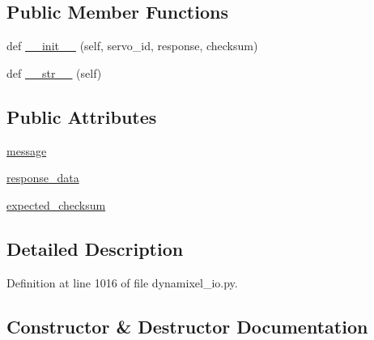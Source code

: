 \subsection*{Public Member Functions}
\begin{DoxyCompactItemize}
\item 
def \hyperlink{classdynamixel__driver_1_1dynamixel__io_1_1_checksum_error_a3d51ca628a86c05c5f99b275d34e79c1}{\+\_\+\+\_\+init\+\_\+\+\_\+} (self, servo\+\_\+id, response, checksum)
\item 
def \hyperlink{classdynamixel__driver_1_1dynamixel__io_1_1_checksum_error_a2e5262a66d600fd86ee3f614a5ecdd32}{\+\_\+\+\_\+str\+\_\+\+\_\+} (self)
\end{DoxyCompactItemize}
\subsection*{Public Attributes}
\begin{DoxyCompactItemize}
\item 
\hyperlink{classdynamixel__driver_1_1dynamixel__io_1_1_checksum_error_ae8841f174bb7a3c7cdc21bc7434458cd}{message}
\item 
\hyperlink{classdynamixel__driver_1_1dynamixel__io_1_1_checksum_error_a5538e10d0a8ce03b332fd7a6f6849380}{response\+\_\+data}
\item 
\hyperlink{classdynamixel__driver_1_1dynamixel__io_1_1_checksum_error_aa680aeae3c6c720e050b442081c2d0cf}{expected\+\_\+checksum}
\end{DoxyCompactItemize}


\subsection{Detailed Description}


Definition at line 1016 of file dynamixel\+\_\+io.\+py.



\subsection{Constructor \& Destructor Documentation}
\mbox{\label{classdynamixel__driver_1_1dynamixel__io_1_1_checksum_error_a3d51ca628a86c05c5f99b275d34e79c1}} 
